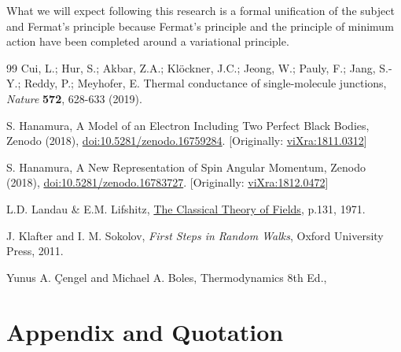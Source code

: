 \documentclass[reprint,amsmath,amssymb,aps,]{revtex4-1}
\numberwithin{equation}{section}%
\begin{document}
    What we will expect following this research is a formal unification of the subject and Fermat's principle because Fermat's principle and the principle of minimum action have been completed around a variational principle.



\begin{thebibliography}{99}
     Cui, L.; Hur, S.; Akbar, Z.A.; Klöckner, J.C.; Jeong, W.; Pauly, F.; Jang, S.-Y.; Reddy, P.; Meyhofer, E. Thermal conductance of single-molecule junctions, \textit{Nature} \textbf{572},  628-633 (2019).
    
     S. Hanamura, A Model of an Electron Including Two Perfect Black Bodies, Zenodo (2018), \href{https://doi.org/10.5281/zenodo.16759284}{doi:10.5281/zenodo.16759284}. [Originally: \href{http://vixra.org/abs/1811.0312}{viXra:1811.0312}]
    
     S. Hanamura, A New Representation of Spin Angular Momentum, Zenodo (2018), \href{https://doi.org/10.5281/zenodo.16783727}{doi:10.5281/zenodo.16783727}. [Originally: \href{http://vixra.org/abs/1812.0472}{viXra:1812.0472}]
    
     L.D. Landau \& E.M. Lifshitz, \href{https://archive.org/details/TheClassicalTheoryOfFields/page/n141}{The Classical Theory of Fields}, p.131, 1971.
    
     J. Klafter and I. M. Sokolov, \textit{First Steps in Random Walks}, Oxford University Press, 2011.
    
     Yunus A. \c{C}engel and Michael A. Boles, Thermodynamics 8th Ed.,
\end{thebibliography}

\section{Appendix and Quotation}
\label{Appendix}

\end{document}
